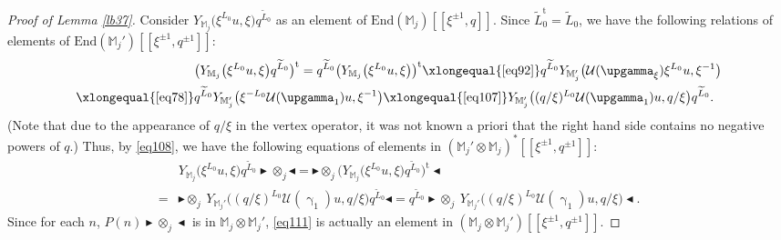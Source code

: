 \documentclass[12pt,b5paper,notitlepage]{report}
\theoremstyle{definition}
\theoremstyle{plain}
\newcommand{\mc}{\mathcal}
\newcommand{\wtd}{\widetilde}
\newcommand{\tr}{\mathrm{t}} %
\newcommand{\End}{\mathrm{End}} %
\newcommand{\Mbb}{\mathbb M}
\newcommand{\btl}{\blacktriangleleft}
\newcommand{\btr}{\blacktriangleright}
\numberwithin{equation}{section}
\begin{document}
\begin{proof}[Proof of Lemma \ref{lb37}]
Consider $Y_{\Mbb_j}\big(\xi^{L_0}u,\xi\big)q^{\wtd L_0}$ as an element of $\End(\Mbb_j)[[\xi^{\pm1},q]]$. Since $\wtd L_0^\tr=\wtd L_0$,  we have the following relations of elements of $\End(\Mbb_j')[[\xi^{\pm1},q^{\pm 1}]]$:
\begin{align*}
&\big(Y_{\Mbb_j}\big(\xi^{L_0}u,\xi\big)q^{\wtd L_0}\big)^\tr=q^{\wtd L_0}\big(Y_{\Mbb_j}\big(\xi^{L_0}u,\xi\big)\big)^\tr\xlongequal{\eqref{eq92}}q^{\wtd L_0}Y_{\Mbb_j'}\big(\mc U(\upgamma_\xi)\xi^{L_0}u,\xi^{-1}\big)\\
\xlongequal{\eqref{eq78}}&q^{\wtd L_0}Y_{\Mbb_j'}\big(\xi^{-L_0}\mc U(\upgamma_1)u,\xi^{-1}\big)\xlongequal{\eqref{eq107}}Y_{\Mbb_j'}\big((q/\xi)^{L_0}\mc U(\upgamma_1)u,q/\xi\big)q^{\wtd L_0}.
\end{align*}
(Note that due to the appearance of $q/\xi$ in the vertex operator,  it was not known a priori that the right hand side contains no negative powers of $q$.) Thus, by \eqref{eq108}, we have the following equations of elements in $(\Mbb_j'\otimes\Mbb_j)^*[[\xi^{\pm1},q^{\pm 1}]]$:
\begin{align}
&Y_{\Mbb_j}\big(\xi^{L_0}u,\xi\big)q^{\wtd L_0}\btr\otimes_j\btl=\btr\otimes_j \big(Y_{\Mbb_j}\big(\xi^{L_0}u,\xi\big)q^{\wtd L_0}\big)^\tr\btl\nonumber\\
=&\btr\otimes_j~Y_{\Mbb_j'}\big((q/\xi)^{L_0}\mc U(\upgamma_1)u,q/\xi\big)q^{\wtd L_0}\btl=q^{\wtd L_0}\btr\otimes_j~Y_{\Mbb_j'}\big((q/\xi)^{L_0}\mc U(\upgamma_1)u,q/\xi\big)\btl.\label{eq111}
\end{align}
Since for each $n$, $P(n)\btr\otimes_j\btl$ is in $\Mbb_j\otimes\Mbb_j'$, \eqref{eq111} is actually an element in $(\Mbb_j\otimes\Mbb_j')[[\xi^{\pm1},q^{\pm 1}]]$.


\end{proof}
\end{document}
